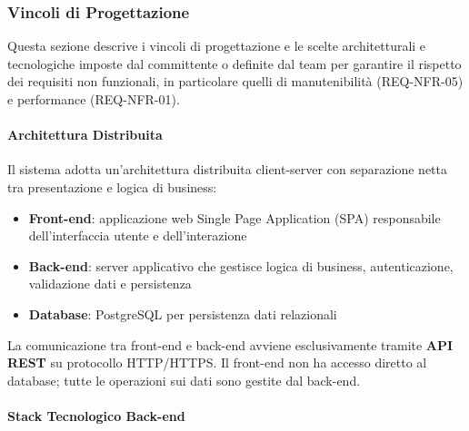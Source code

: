 \newpage
\subsubsection{Vincoli di Progettazione}
\label{subsec:vincoli-progettazione}

Questa sezione descrive i vincoli di progettazione e le scelte architetturali e tecnologiche imposte dal committente o definite dal team per garantire il rispetto dei requisiti non funzionali, in particolare quelli di manutenibilità (REQ-NFR-05) e performance (REQ-NFR-01).

\paragraph{Architettura Distribuita}
\label{subsubsec:architettura-distribuita}

Il sistema \productname{} adotta un'architettura distribuita client-server con separazione netta tra presentazione e logica di business:

\begin{itemize}[leftmargin=1.1em]
\item \textbf{Front-end}: applicazione web Single Page Application (SPA) responsabile dell'interfaccia utente e dell'interazione
\item \textbf{Back-end}: server applicativo che gestisce logica di business, autenticazione, validazione dati e persistenza
\item \textbf{Database}: PostgreSQL per persistenza dati relazionali
\end{itemize}

La comunicazione tra front-end e back-end avviene esclusivamente tramite \textbf{API REST} su protocollo HTTP/HTTPS. Il front-end non ha accesso diretto al database; tutte le operazioni sui dati sono gestite dal back-end.

\paragraph{Stack Tecnologico Back-end}
\label{subsubsec:stack-backend}

